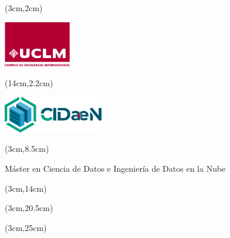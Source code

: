 %
% 
\pagestyle{empty}
\begin{titlepage}\null
\begin{textblock*}{3cm}(3cm,2cm) 
\begin{flushleft}
\includegraphics[height=2cm]{figs/logouclm.png}
\end{flushleft}
\end{textblock*}



\begin{textblock*}{2cm}(14cm,2.2cm)  %
\begin{flushright}
\includegraphics[height=1.6cm]{figs/CIDaeN.png}
\end{flushright}
\end{textblock*}



\begin{textblock*}{\textwidth}(3cm,8.5cm) 
\begin{center}\doublespacing 
{\fontsize{18pt}{4pt}\selectfont {}}

\bigskip
{\fontsize{18pt}{4pt}\selectfont Máster en Ciencia de Datos e Ingeniería de Datos en la Nube }


\end{center}
\end{textblock*}


\begin{textblock*}{\textwidth}(3cm,14cm) 
\begin{center} 
{\fontsize{22pt}{4pt}\selectfont \bft{\titulo}}
\end{center}
\end{textblock*}


\begin{textblock*}{\textwidth}(3cm,20.5cm) 
\begin{flushleft}\doublespacing
{\fontsize{14pt}{4pt}\selectfont {} \autor}

{\fontsize{14pt}{4pt}\selectfont {} \director}
\end{flushleft}
\end{textblock*}


\begin{textblock*}{\linewidth}(3cm,25cm) 
\begin{flushright}
{\fontsize{14pt}{4pt}\selectfont \fecha}
\end{flushright}
\end{textblock*}
\end{titlepage}